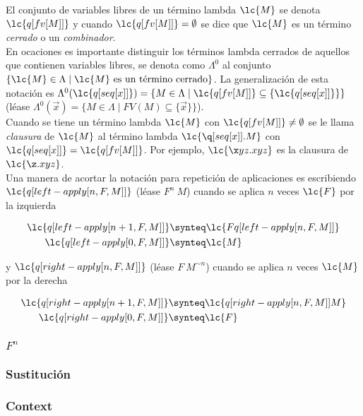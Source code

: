 El conjunto de variables libres de un término lambda \(\lc{M}\) se denota
\(\lc{q[fv[M]]}\) y cuando \(\lc{q[fv[M]]}=\emptyset\) se dice que \(\lc{M}\) es
un término \emph{cerrado} o un \emph{combinador}. \\

En ocaciones es importante distinguir los términos lambda cerrados de aquellos
que contienen variables libres, se denota como \(\Lambda^{0}\) al conjunto \(\{\lc{M}
\in \Lambda \mid \lc{M} \text{ es un término cerrado}\}\). La generalización de
esta notación es \(\Lambda^{0}(\lc{q[seq[x]]})=\{M\in\Lambda \mid
\lc{q[fv[M]]}\subseteq \{\lc{q[seq[x]]}\}\}\) (léase
\(\Lambda^{0}(\vec{x})=\{M\in\Lambda \mid FV(M)\subseteq \{\vec{x}\}\}\)). \\

Cuando se tiene un término lambda \(\lc{M}\) con \(\lc{q[fv[M]]} \not=
\emptyset\) se le llama \emph{clausura} de \(\lc{M}\) al término lambda
\(\lc{\q[seq[x]].M}\) con \(\lc{q[seq[x]]}=\lc{q[fv[M]]}\). Por ejemplo,
\(\lc{\x y z.x y z}\) es la clausura de \(\lc{\z.x y z}\). \\

Una manera de acortar la notación para repetición de aplicaciones es escribiendo
\(\lc{q[left-apply[n,F,M]]}\) (léase \(F^{n}\ M\)) cuando se aplica \(n\) veces
\(\lc{F}\) por la izquierda

\begin{align*}
  \lc{q[left-apply[n+1,F,M]]} &\synteq \lc{F q[left-apply[n,F,M]]}\\
  \lc{q[left-apply[0,F,M]]}   &\synteq \lc{M}
\end{align*}

y \(\lc{q[right-apply[n,F,M]]}\) (léase \(F\ M^{\sim n}\)) cuando se aplica
\(n\) veces \(\lc{M}\) por la derecha

\begin{align*}
  \lc{q[right-apply[n+1,F,M]]} &\synteq \lc{q[right-apply[n,F,M]] M}\\
  \lc{q[right-apply[0,F,M]]}   &\synteq \lc{F}
\end{align*}


\subsubsection{\(F^{n}\)}
\subsubsection{Sustitución}
\subsubsection{Context}
